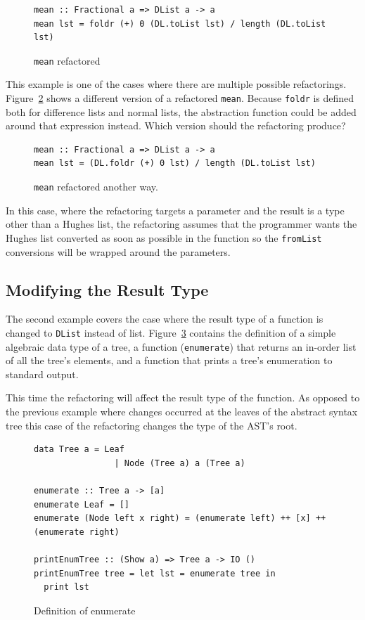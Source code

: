 \begin{figure}[t]
\begin{lstlisting}
mean :: Fractional a => DList a -> a
mean lst = foldr (+) 0 (DL.toList lst) / length (DL.toList lst)
\end{lstlisting}  
\caption{\texttt{mean} refactored}
\label{meanRef} 
\end{figure}

This example is one of the cases where there are multiple possible refactorings. Figure~\ref{meanRef2} shows a different version of a refactored \texttt{mean}. Because \texttt{foldr} is defined both for difference lists and normal lists, the abstraction function could be added around that expression instead. Which version should the refactoring produce?

\begin{figure}[t]
\begin{lstlisting}
mean :: Fractional a => DList a -> a
mean lst = (DL.foldr (+) 0 lst) / length (DL.toList lst)
\end{lstlisting}  
\caption{\texttt{mean} refactored another way.}
\label{meanRef2}
\end{figure}  

In this case, where the refactoring targets a parameter and the result is a type other than a Hughes list, the refactoring assumes that the programmer wants the Hughes list converted as soon as possible in the function so the \texttt{fromList} conversions will be wrapped around the parameters. 

\subsection{Modifying the Result Type}
\label{hugesListResTy}

The second example covers the case where the result type of a function is changed to \texttt{DList} instead of list. Figure~\ref{enumBefore} contains the definition of a simple algebraic data type of a tree, a function (\texttt{enumerate}) that returns an in-order list of all the tree's elements, and a function that prints a tree's enumeration to standard output. 

This time the refactoring will affect the result type of the function. As opposed to the previous example where changes occurred at the leaves of the abstract syntax tree this case of the refactoring changes the type of the AST's root. 

\begin{figure}[t]
\begin{lstlisting}
data Tree a = Leaf
                | Node (Tree a) a (Tree a)

enumerate :: Tree a -> [a]
enumerate Leaf = []
enumerate (Node left x right) = (enumerate left) ++ [x] ++ (enumerate right)

printEnumTree :: (Show a) => Tree a -> IO ()
printEnumTree tree = let lst = enumerate tree in
  print lst
\end{lstlisting}
\caption{Definition of enumerate}
\label{enumBefore}
\end{figure} 

